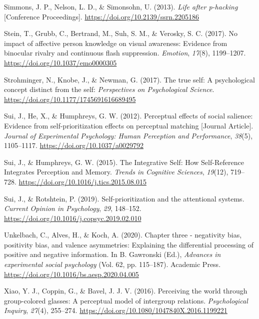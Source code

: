 \documentclass[
  man]{apa6}
\newlength{\cslhangindent}
\newlength{\cslentryspacingunit} %
\newenvironment{CSLReferences}[2] %
 {%
  \setlength{\parindent}{0pt}
  \ifodd #1
  \let\oldpar\par
  \def\par{\hangindent=\cslhangindent\oldpar}
  \fi
  \setlength{\parskip}{#2\cslentryspacingunit}
 }%
 {}
\begin{document}
\begin{CSLReferences}{1}{0}
\leavevmode{}%
Simmons, J. P., Nelson, L. D., \& Simonsohn, U. (2013). \emph{Life after p-hacking} {[}Conference Proceedings{]}. \url{https://doi.org/10.2139/ssrn.2205186}

\leavevmode{}%
Stein, T., Grubb, C., Bertrand, M., Suh, S. M., \& Verosky, S. C. (2017). No impact of affective person knowledge on visual awareness: Evidence from binocular rivalry and continuous flash suppression. \emph{Emotion}, \emph{17}(8), 1199--1207. \url{https://doi.org/10.1037/emo0000305}

\leavevmode{}%
Strohminger, N., Knobe, J., \& Newman, G. (2017). The true self: A psychological concept distinct from the self: \emph{Perspectives on Psychological Science}. \url{https://doi.org/10.1177/1745691616689495}

\leavevmode{}%
Sui, J., He, X., \& Humphreys, G. W. (2012). Perceptual effects of social salience: Evidence from self-prioritization effects on perceptual matching {[}Journal Article{]}. \emph{Journal of Experimental Psychology: Human Perception and Performance}, \emph{38}(5), 1105--1117. \url{https://doi.org/10.1037/a0029792}

\leavevmode{}%
Sui, J., \& Humphreys, G. W. (2015). The {Integrative} {Self}: {How} {Self}-{Reference} {Integrates} {Perception} and {Memory}. \emph{Trends in Cognitive Sciences}, \emph{19}(12), 719--728. \url{https://doi.org/10.1016/j.tics.2015.08.015}

\leavevmode{}%
Sui, J., \& Rotshtein, P. (2019). Self-prioritization and the attentional systems. \emph{Current Opinion in Psychology}, \emph{29}, 148--152. \url{https://doi.org/10.1016/j.copsyc.2019.02.010}

\leavevmode{}%
Unkelbach, C., Alves, H., \& Koch, A. (2020). Chapter three - negativity bias, positivity bias, and valence asymmetries: Explaining the differential processing of positive and negative information. In B. Gawronski (Ed.), \emph{Advances in experimental social psychology} (Vol. 62, pp. 115--187). Academic Press. \url{https://doi.org/10.1016/bs.aesp.2020.04.005}

\leavevmode{}%
Xiao, Y. J., Coppin, G., \& Bavel, J. J. V. (2016). Perceiving the world through group-colored glasses: A perceptual model of intergroup relations. \emph{Psychological Inquiry}, \emph{27}(4), 255--274. \url{https://doi.org/10.1080/1047840X.2016.1199221}

\end{CSLReferences}

\endgroup
\end{document}
